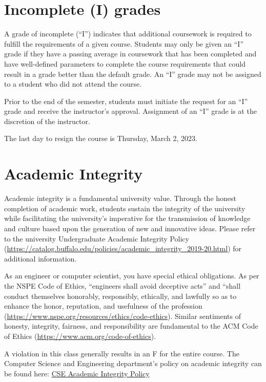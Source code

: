 \documentclass{article}
\begin{document}
\section{Incomplete (I) grades}
A grade of incomplete (“I”) indicates that additional coursework is required to fulfill the requirements of a given course. Students may only be given an “I” grade if they have a passing average in coursework that has been completed and have well-defined parameters to complete the course requirements that could result in a grade better than the default grade. An “I” grade may not be assigned to a student who did not attend the course.

Prior to the end of the semester, students must initiate the request for an “I” grade and receive the instructor’s approval. Assignment of an “I” grade is at the discretion of the instructor.

The last day to resign the course is Thursday, March 2, 2023.

\section{Academic Integrity}
Academic integrity is a fundamental university value. Through the honest completion of academic work, students sustain the integrity of the university while facilitating the university's imperative for the transmission of knowledge and culture based upon the generation of new and innovative ideas. Please refer to the university Undergraduate Academic Integrity Policy (\url{https://catalog.buffalo.edu/policies/academic_integrity_2019-20.html}) for additional information.

As an engineer or computer scientist, you have special ethical obligations. As per the NSPE Code of Ethics, “engineers shall avoid deceptive acts” and “shall conduct themselves honorably, responsibly, ethically, and lawfully so as to enhance the honor, reputation, and usefulness of the profession (\url{https://www.nspe.org/resources/ethics/code-ethics}). Similar sentiments of honesty, integrity, fairness, and responsibility are fundamental to the ACM Code of Ethics (\url{https://www.acm.org/code-of-ethics}).

A violation in this class generally results in an F for the entire course. The Computer Science and Engineering department's policy on academic integrity can be found here:
\href{https://engineering.buffalo.edu/computer-science-engineering/information-for-students/undergraduate-program/cse-undergraduate-academic-policies/cse-academic-integrity-policy.html}{CSE Academic Integrity Policy}
\end{document}

